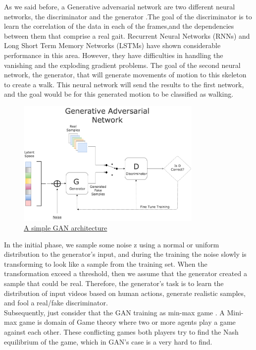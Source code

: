 As we said before, a Generative adversarial network are two different neural networks, the discriminator and the generator .The goal of the discriminator is to learn the correlation of the data in each of the frames,and the dependencies between them that comprise a real gait. Recurrent Neural Networks (RNNs) and Long Short Term Memory Networks (LSTMs) have shown considerable performance in this area. However, they have difficulties in handling the vanishing and the exploding gradient problems. The goal of the second neural network, the generator, that will generate movements of motion to this skeleton to create a walk. This neural network will send the results to the first network, and the goal would be for this generated motion to be classified as walking.

\pagebreak

 \begin{figure}[h]
	\centering
	\includegraphics[width=0.8\textwidth]{figures/background/GAN.png}
	\captionsetup{labelformat=empty}
	\caption{\href{https://bolster.ai/blog/content/images/2020/04/GAN-1.png}
	{A simple GAN architecture}}
\end{figure}


In the initial phase, we sample some noise z using a normal or uniform distribution to the generator's input, and during the training the noise slowly is transforming to look like a sample from the training set. When the transformation exceed a threshold, then we assume that the generator created a sample that could be real. Therefore, the generator's task is to learn the distribution of input videos based on human actions, generate realistic samples, and fool a real/fake discriminator.\\

Subsequently, just consider that the GAN training as min-max game \cite{Human Action Generation with Generative Adversarial Networks}. A Mini-max game is domain of Game theory where two or more agents play a game against each other. These conflicting games both players try to find the Nash equilibrium of the game, which in GAN's case is a very hard to find. 


